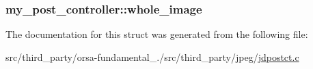 \subsubsection[{whole\+\_\+image}]{ my\+\_\+post\+\_\+controller\+::whole\+\_\+image}\label{structmy__post__controller_ac2336623f2e802993b35b7db30053b68}


The documentation for this struct was generated from the following file\+:\begin{DoxyCompactItemize}
\item 
src/third\+\_\+party/orsa-\/fundamental\+\_./src/third\+\_\+party/jpeg/\hyperlink{jdpostct_8c}{jdpostct.\+c}\end{DoxyCompactItemize}
